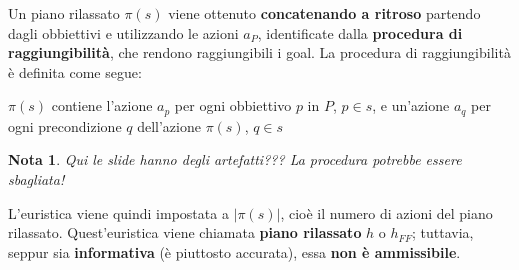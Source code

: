 \documentclass[12pt]{article}
\newtheorem{Nota}{Nota}[subsection]
\begin{document}
Un piano rilassato $\pi(s)$ viene ottenuto \textbf{concatenando a ritroso} partendo dagli obbiettivi e utilizzando le azioni $a_P$, identificate dalla \textbf{procedura di raggiungibilità}, che rendono raggiungibili i goal.
La procedura di raggiungibilità è definita come segue:
\begin{center}
    $\pi(s)$ contiene l'azione $a_p$ per ogni obbiettivo $p$ in $P$, $p \in s$, e un'azione $a_q$ per ogni precondizione $q$ dell'azione $\pi(s)$, $q \in s$
\end{center}
\begin{Nota}
    Qui le slide hanno degli artefatti??? La procedura potrebbe essere sbagliata!
\end{Nota}
L'euristica viene quindi impostata a $|\pi(s)|$, cioè il numero di azioni del piano rilassato.
Quest'euristica viene chiamata \textbf{piano rilassato} $h$ o $h_{FF}$; tuttavia, seppur sia \textbf{informativa} (è piuttosto accurata), essa \textbf{non è ammissibile}.
\end{document}
